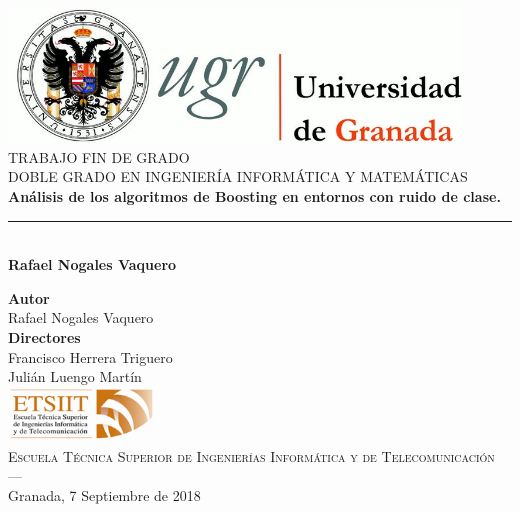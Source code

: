 \begin{titlepage}
 
 
\newlength{\centeroffset}
\setlength{\centeroffset}{-0.5\oddsidemargin}
\addtolength{\centeroffset}{0.5\evensidemargin}
\thispagestyle{empty}

\noindent\hspace*{\centeroffset}\begin{minipage}{\textwidth}

\centering
\includegraphics[width=0.9\textwidth]{imagenes/logo_ugr.jpg}\\[1.4cm]

\textsc{ \Large TRABAJO FIN DE GRADO\\[0.2cm]}
\textsc{ DOBLE GRADO EN INGENIERÍA INFORMÁTICA Y MATEMÁTICAS }\\[1cm]
% 
{\Huge\bfseries Análisis de los algoritmos de Boosting en entornos con ruido de clase.\\
}
\noindent\rule[-1ex]{\textwidth}{3pt}\\[3.5ex]
{\large\bfseries Rafael Nogales Vaquero}
\end{minipage}

\vspace{2.5cm}
\noindent\hspace*{\centeroffset}\begin{minipage}{\textwidth}
\centering

\textbf{Autor}\\ {Rafael Nogales Vaquero}\\[2.5ex]
\textbf{Directores}\\
{Francisco Herrera Triguero \\
Julián Luengo Martín}\\[2cm]
\includegraphics[width=0.3\textwidth]{imagenes/etsiit_logo.png}\\[0.1cm]
\textsc{Escuela Técnica Superior de Ingenierías Informática y de Telecomunicación}\\
\textsc{---}\\
Granada, 7 Septiembre de 2018
\end{minipage}
\end{titlepage}


